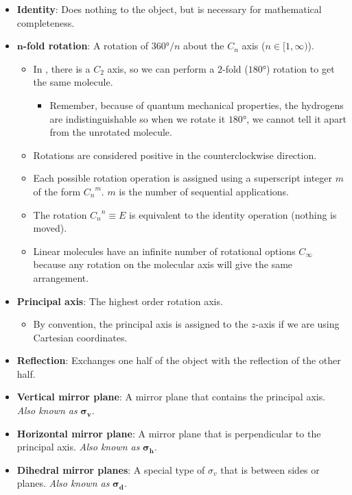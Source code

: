 \documentclass[../notes.tex]{subfiles}
\begin{document}
\begin{itemize}
    \item \textbf{Identity}: Does nothing to the object, but is necessary for mathematical completeness.
    \item \textbf{$\bm{n}$-fold rotation}: A rotation of $\ang{360}/n$ about the $C_n$ axis ($n\in[1,\infty)$).
    \begin{itemize}
        \item In , there is a $C_2$ axis, so we can perform a $2$-fold ($\ang{180}$) rotation to get the same molecule.
        \begin{itemize}
            \item Remember, because of quantum mechanical properties, the hydrogens are indistinguishable so when we rotate it $\ang{180}$, we cannot tell it apart from the unrotated molecule.
        \end{itemize}
        \item Rotations are considered positive in the counterclockwise direction.
        \item Each possible rotation operation is assigned using a superscript integer $m$ of the form ${C_n}^m$. $m$ is the number of sequential applications.
        \item The rotation ${C_n}^n\equiv E$ is equivalent to the identity operation (nothing is moved).
        \item Linear molecules have an infinite number of rotational options $C_\infty$ because any rotation on the molecular axis will give the same arrangement.
    \end{itemize}
    \item \textbf{Principal axis}: The highest order rotation axis.
    \begin{itemize}
        \item By convention, the principal axis is assigned to the $z$-axis if we are using Cartesian coordinates.
    \end{itemize}
    \item \textbf{Reflection}: Exchanges one half of the object with the reflection of the other half.
    \item \textbf{Vertical mirror plane}: A mirror plane that contains the principal axis. \emph{Also known as} $\bm{\sigma_v}$.
    \item \textbf{Horizontal mirror plane}: A mirror plane that is perpendicular to the principal axis. \emph{Also known as} $\bm{\sigma_h}$.
    \item \textbf{Dihedral mirror planes}: A special type of $\sigma_v$ that is between sides or planes. \emph{Also known as} $\bm{\sigma_d}$.

\end{itemize}
\end{document}
